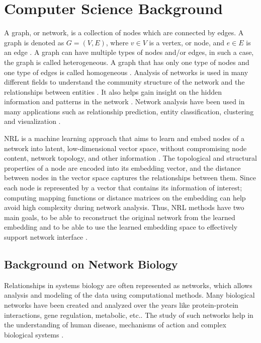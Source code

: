 \chapter{Computer Science Background}
\label{ch:computerscience}

A graph, or network, is a collection of nodes which are connected by edges. A graph is denoted as $G=(V,E)$, where $v \in V$ is a vertex, or node, and $e \in E$ is an edge \cite{cai_comprehensive_2017}. A graph can have multiple types of nodes and/or edges, in such a case, the graph is called heterogeneous. A graph that has only one type of nodes and one type of edges is called homogeneous \cite{cai_comprehensive_2017}. Analysis of networks is used in many different fields to understand the community structure of the network and the relationships between entities \cite{cai_comprehensive_2017}. It also helps gain insight on the hidden information and patterns in the network \cite{cai_comprehensive_2017}. Network analysis have been used in many applications such as relationship prediction, entity classification, clustering and visualization \cite{goyal_graph_2018}.

\ac{NRL} is a machine learning approach that aims to learn and embed nodes of a network into latent, low-dimensional vector space, without compromising node content, network topology, and other information \cite{zhang_network_2017}. The topological and structural properties of a node are encoded into its embedding vector, and the distance between nodes in the vector space captures the relationships between them. Since each node is represented by a vector that contains its information of interest; computing mapping functions or distance matrices on the embedding can help avoid high complexity during network analysis. Thus, \ac{NRL} methods have two main goals, to be able to reconstruct the original network from the learned embedding and to be able to use the learned embedding space to effectively support network interface \cite{sheikh_gat2vec:_2018}.

\section{Background on Network Biology}

Relationships in systems biology are often represented as networks, which allows analysis and modeling of the data using computational methods. Many biological networks have been created and analyzed over the years like protein-protein interactions, gene regulation, metabolic, etc..
The study of such networks help in the understanding of human disease, mechanisms of action and complex biological systems \cite{dancik_properties_2013}.

